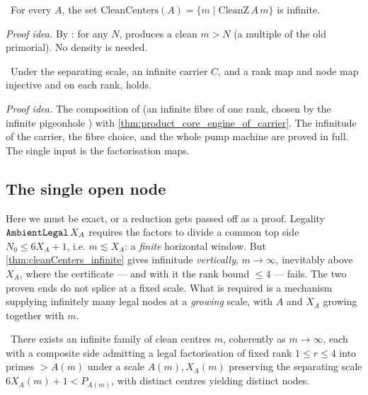 \begin{theorem}\label{thm:cleanCenters_infinite}
\green{}\ For every $A$, the set $\mathrm{CleanCenters}(A)=\{m\mid\mathrm{CleanZ}\,A\,m\}$ is infinite.
\end{theorem}

\emph{Proof idea.} By : for any $N$, 
produces a clean $m>N$ (a multiple of the old primorial). No density is needed.

\begin{theorem}\label{thm:engine_of_carrier_and_factorize}
\green{}\ Under the separating scale, an infinite carrier $C$, and a rank map  and node map
 injective and  on each rank,  holds.
\end{theorem}

\emph{Proof idea.} The composition of  (an infinite fibre of one
rank, chosen by the infinite pigeonhole ) with
\cref{thm:product_core_engine_of_carrier}. The infinitude of the carrier, the fibre choice,
and the whole pump machine are proved in full. The single input is the factorisation maps.

\subsection{The single open node}

Here we must be exact, or a reduction gets passed off as a proof. Legality $\texttt{AmbientLegal}\,X_A$
requires the factors to divide a common top side $N_0\le6X_A+1$, i.e. $m\lesssim X_A$: a \emph{finite}
horizontal window. But \cref{thm:cleanCenters_infinite} gives infinitude \emph{vertically},
$m\to\infty$, inevitably above $X_A$, where the certificate --- and with it the rank bound $\le4$ ---
fails. The two proven ends do not splice at a fixed scale. What is required is a mechanism supplying
infinitely many legal nodes at a \emph{growing} scale, with $A$ and $X_A$ growing together with $m$.

\begin{conjecture}\label{conj:globaloldabsorption}
\red{}\ There exists an infinite family of clean centres $m$, coherently as $m\to\infty$, each with a
composite side admitting a legal factorisation of fixed rank $1\le r\le4$ into primes $>A(m)$ under a
scale $A(m),X_A(m)$ preserving the separating scale $6X_A(m)+1<P_{A(m)}$, with distinct centres
yielding distinct nodes. 
\end{conjecture}

